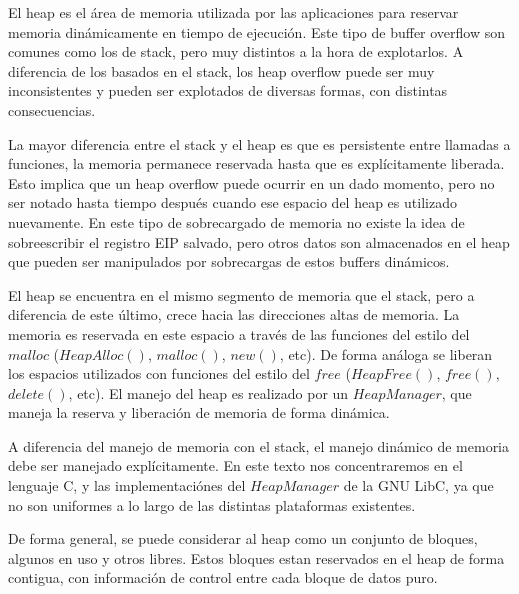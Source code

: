 	\vspace{5 mm}
	
	
	El heap es el \'area de memoria utilizada por las aplicaciones para reservar memoria din\'amicamente en tiempo de ejecuci\'on. Este tipo de buffer overflow son comunes como los de stack, pero muy distintos a la hora de explotarlos. A diferencia de los basados en el stack, los heap overflow puede ser muy inconsistentes y pueden ser explotados de diversas formas, con distintas consecuencias.
	
	La mayor diferencia entre el stack y el heap es que es persistente entre llamadas a funciones, la memoria permanece reservada hasta que es expl\'icitamente liberada. Esto implica que un heap overflow puede ocurrir en un dado momento, pero no ser notado hasta tiempo despu\'es cuando ese espacio del heap es utilizado nuevamente. En este tipo de sobrecargado de memoria no existe la idea de sobreescribir el registro EIP salvado, pero otros datos son almacenados en el heap que pueden ser manipulados por sobrecargas de estos buffers din\'amicos.
	
	El heap se encuentra en el mismo segmento de memoria que el stack, pero a diferencia de este \'ultimo, crece hacia las direcciones altas de memoria. La memoria es reservada en este espacio a trav\'es de las funciones del estilo del $malloc$ ($HeapAlloc()$, $malloc()$, $new()$, etc). De forma an\'aloga se liberan los espacios utilizados con funciones del estilo del $free$ ($HeapFree()$, $free()$, $delete()$, etc). El manejo del heap es realizado por un $Heap Manager$, que maneja la reserva y liberaci\'on de memoria de forma din\'amica.
	
	A diferencia del manejo de memoria con el stack, el manejo din\'amico de memoria debe ser manejado expl\'icitamente. En este texto nos concentraremos en el lenguaje C, y las implementaci\'ones del $Heap Manager$ de la GNU LibC, ya que no son uniformes a lo largo de las distintas plataformas existentes.
	
	De forma general, se puede considerar al heap como un conjunto de bloques, algunos en uso y otros libres. Estos bloques estan reservados en el heap de forma contigua, con informaci\'on de control entre cada bloque de datos puro.
	
